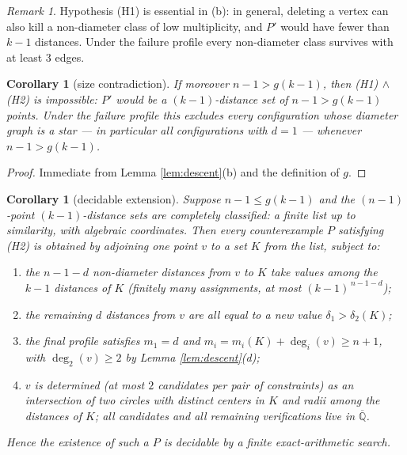 \documentclass[11pt]{article}
\newtheorem{corollary}[theorem]{Corollary}
\theoremstyle{definition}
\theoremstyle{remark}
\newtheorem{remark}[theorem]{Remark}
\newcommand{\Q}{\mathbb{Q}}
\begin{document}
\begin{remark}
Hypothesis (H1) is essential in (b): in general, deleting a vertex can also kill a
non-diameter class of low multiplicity, and $P'$ would have fewer than $k-1$ distances.
Under the failure profile every non-diameter class survives with at least $3$ edges.
\end{remark}

\begin{corollary}[size contradiction]\label{cor:size}
If moreover $n - 1 > g(k-1)$, then \emph{(H1)}$\,\wedge\,$\emph{(H2)} is impossible: $P'$
would be a $(k-1)$-distance set of $n-1 > g(k-1)$ points. Under the failure profile this
excludes every configuration whose diameter graph is a star --- in particular all
configurations with $d = 1$ --- whenever $n - 1 > g(k-1)$.
\end{corollary}

\begin{proof}
Immediate from Lemma \ref{lem:descent}(b) and the definition of $g$.
\end{proof}

\begin{corollary}[decidable extension]\label{cor:extension}
Suppose $n - 1 \le g(k-1)$ and the $(n-1)$-point $(k-1)$-distance sets are completely
classified: a finite list up to similarity, with algebraic coordinates. Then every
counterexample $P$ satisfying \emph{(H2)} is obtained by adjoining one point $v$ to a set
$K$ from the list, subject to:
\begin{enumerate}
\item the $n-1-d$ non-diameter distances from $v$ to $K$ take values among the $k-1$
distances of $K$ (finitely many assignments, at most $(k-1)^{\,n-1-d}$);
\item the remaining $d$ distances from $v$ are all equal to a new value
$\delta_1 > \delta_2(K)$;
\item the final profile satisfies $m_1 = d$ and $m_i = m_i(K) + \deg_i(v) \ge n+1$, with
$\deg_2(v) \ge 2$ by Lemma \ref{lem:descent}(d);
\item $v$ is determined (at most $2$ candidates per pair of constraints) as an
intersection of two circles with distinct centers in $K$ and radii among the distances of
$K$; all candidates and all remaining verifications live in $\overline{\Q}$.
\end{enumerate}
Hence the existence of such a $P$ is decidable by a finite exact-arithmetic search.
\end{corollary}
\end{document}

